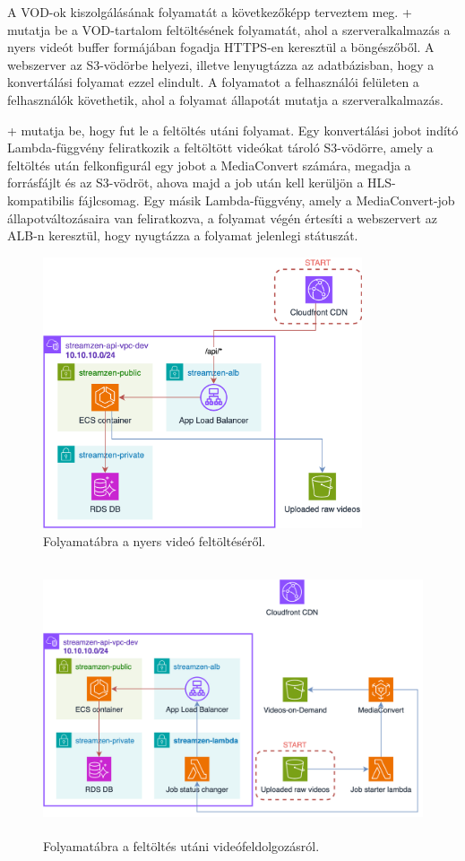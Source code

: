 A VOD-ok kiszolgálásának folyamatát a következőképp terveztem meg. \Az+ mutatja be a VOD-tartalom feltöltésének folyamatát, ahol a szerveralkalmazás a nyers videót buffer formájában fogadja HTTPS-en keresztül a böngészőből. A webszerver az S3-vödörbe helyezi, illetve lenyugtázza az adatbázisban, hogy a konvertálási folyamat ezzel elindult. A folyamatot a felhasználói felületen a felhasználók követhetik, ahol a folyamat állapotát mutatja a szerveralkalmazás.

\Az+ mutatja be, hogy fut le a feltöltés utáni folyamat. Egy konvertálási jobot indító Lambda-függvény feliratkozik a feltöltött videókat tároló S3-vödörre, amely a feltöltés után felkonfigurál egy jobot a MediaConvert számára, megadja a forrásfájlt és az S3-vödröt, ahova majd a job után kell kerüljön a HLS-kompatibilis fájlcsomag. Egy másik Lambda-függvény, amely a MediaConvert-job állapotváltozásaira van feliratkozva, a folyamat végén értesíti a webszervert az ALB-n keresztül, hogy nyugtázza a folyamat jelenlegi státuszát.

\begin{figure}[h]
	\centering
	\includegraphics[height=80mm, keepaspectratio]{figures/dipterv_vod1.png}
	\caption{Folyamatábra a nyers videó feltöltéséről.}
	\label{fig:vod1}
\end{figure}

\begin{figure}[h]
	\centering
	\includegraphics[height=80mm, keepaspectratio]{figures/dipterv_vod2.png}
	\caption{Folyamatábra a feltöltés utáni videófeldolgozásról.}
	\label{fig:vod2}
\end{figure}

